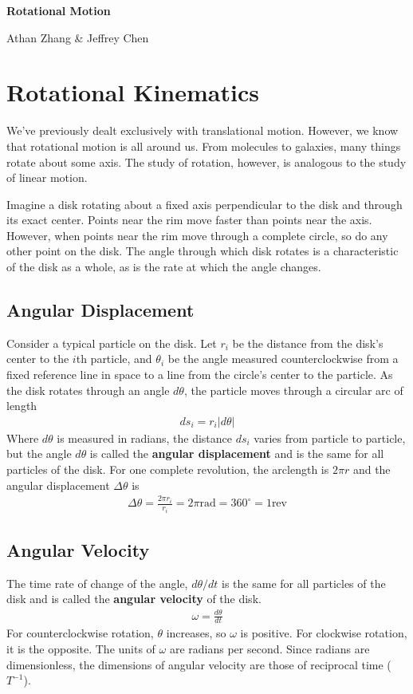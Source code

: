 \documentclass[11pt]{article}
\begin{document}
\textbf{\Huge Rotational Motion}

Athan Zhang \& Jeffrey Chen

\section{Rotational Kinematics}

We've previously dealt exclusively with translational motion. However, we know that rotational motion is all around us. From molecules to galaxies, many things rotate about some axis. The study of rotation, however, is analogous to the study of linear motion. 

Imagine a disk rotating about a fixed axis perpendicular to the disk and through its exact center. Points near the rim move faster than points near the axis. However, when points near the rim move through a complete circle, so do any other point on the disk. The angle through which disk rotates is a characteristic of the disk as a whole, as is the rate at which the angle changes.

\subsection{Angular Displacement}
Consider a typical particle on the disk. Let $r_i$ be the distance from the disk's center to the $i$th particle, and $\theta_i$ be the angle measured counterclockwise from a fixed reference line in space to a line from the circle's center to the particle. As the disk rotates through an angle $d\theta$, the particle moves through a circular arc of length 
\begin{align*}
    ds_i = r_i|d\theta|
\end{align*}
Where $d\theta$ is measured in radians, the distance $ds_i$ varies from particle to particle, but the angle $d\theta$ is called the \textbf{angular displacement} and is the same for all particles of the disk. For one complete revolution, the arclength is $2\pi r$ and the angular displacement $\Delta\theta$ is 
\begin{align*}
    \Delta\theta = \frac{2\pi r_i}{r_i} = 2\pi \text{rad} = 360^{\circ} = 1 \text{rev}
\end{align*}

\subsection{Angular Velocity}
The time rate of change of the angle, $d\theta/dt$ is the same for all particles of the disk and is called the \textbf{angular velocity} of the disk.
\begin{align*}
    \omega = \frac{d\theta}{dt}
\end{align*}
For counterclockwise rotation, $\theta$ increases, so $\omega$ is positive. For clockwise rotation, it is the opposite. The units of $\omega$ are radians per second. Since radians are dimensionless, the dimensions of angular velocity are those of reciprocal time ($T^{-1}$).
\end{document}
